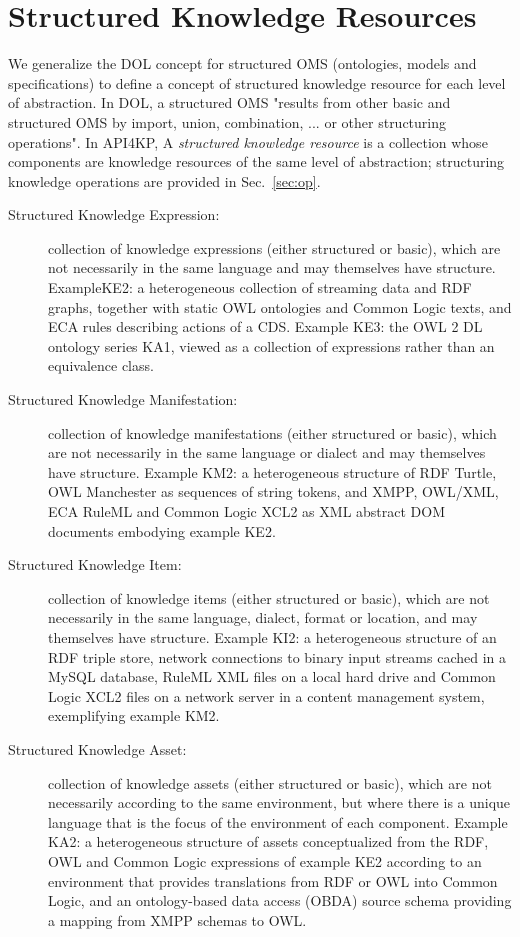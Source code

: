 \documentclass[runningheads]{llncs}
\begin{document}
\section{Structured Knowledge Resources}
\label{sec:structure}
We generalize the DOL concept for structured OMS (ontologies, models and specifications) to define a concept of structured knowledge resource for each level of abstraction. In DOL, a structured OMS "results from other basic and structured OMS by import, union, combination, ... or other structuring operations".
In API4KP, A \emph{structured knowledge resource} is a collection whose components are knowledge resources of the same level of abstraction; structuring knowledge operations are provided in Sec.~\ref{sec:op}.
\begin{description}
\item[Structured Knowledge Expression:] collection of knowledge expressions (either structured or basic), which are not necessarily in the same language and may themselves have structure. ExampleKE2: a heterogeneous collection of streaming data and RDF graphs, together with static OWL ontologies and Common Logic texts, and ECA rules describing actions of a CDS. Example KE3: the OWL 2 DL ontology series KA1, viewed as a collection of expressions rather than an equivalence class.
\item[Structured Knowledge Manifestation:] collection of knowledge manifestations (either structured or basic), which are not necessarily in the same language or dialect and may themselves have structure. Example KM2: a heterogeneous structure of RDF Turtle, OWL Manchester as sequences of string tokens, and XMPP, OWL/XML, ECA RuleML and Common Logic XCL2 as XML abstract DOM documents embodying example KE2.
\item[Structured Knowledge Item:] collection of knowledge items  (either structured or basic), which are not necessarily in the same language, dialect, format or location, and may themselves have structure. Example KI2:  a heterogeneous structure of an RDF triple store, network connections to binary input streams cached in a MySQL database, RuleML XML files on a local hard drive and Common Logic XCL2 files on a network server in a content management system, exemplifying example KM2.
\item[Structured Knowledge Asset:] collection of knowledge assets  (either structured or basic), which are not necessarily according to the same environment, but where there is a unique language that is the focus of the environment of each component. Example KA2: a heterogeneous structure of assets conceptualized from the RDF, OWL and Common Logic expressions of example KE2 according to an environment that provides translations from RDF or OWL into Common Logic, and an ontology-based data access (OBDA) source schema providing a mapping from XMPP schemas to OWL.
\end{description}
\end{document}
